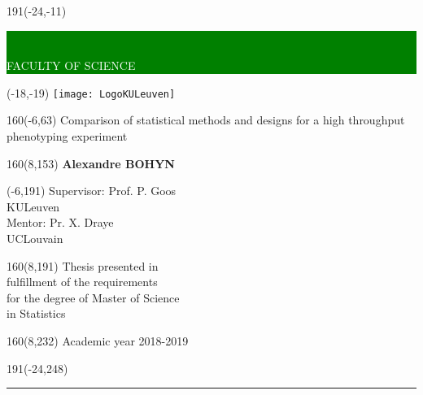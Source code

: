 \thispagestyle{empty}
\newcommand{\form}[1]{\scalebox{1.087}{\boldmath{#1}}}

%
\begin{textblock}{191}(-24,-11)
\colorbox{green}{\hspace{139mm}\ \parbox[c][18truemm]{52mm}{\textcolor{white}{FACULTY OF SCIENCE}}}
\end{textblock}
%
\begin{textblock}{70}(-18,-19)
\textblockcolour{}
\texttt{[image: LogoKULeuven]}
\end{textblock}
%
\begin{textblock}{160}(-6,63)
\textblockcolour{}
\vspace{-\parskip}
\flushleft
\fontsize{40}{42}\selectfont \textcolor{bluetitle}{Comparison of statistical methods and designs for a high throughput phenotyping experiment}\\[1.5mm]
\end{textblock}
%
\begin{textblock}{160}(8,153)
\textblockcolour{}
\vspace{-\parskip}
\flushright
\fontsize{14}{16}\selectfont \textbf{Alexandre BOHYN}
\end{textblock}
%
\begin{textblock}{70}(-6,191)
\textblockcolour{}
\vspace{-\parskip}
\flushleft
Supervisor: Prof. P. Goos\\[-2pt]
\textcolor{blueaff}{KULeuven}\\[5pt]
Mentor: Pr. X. Draye\\[-2pt]
\textcolor{blueaff}{UCLouvain}\\[5pt]
\end{textblock}
%
\begin{textblock}{160}(8,191)
\textblockcolour{}
\vspace{-\parskip}
\flushright
Thesis presented in\\[4.5pt]
fulfillment of the requirements\\[4.5pt]
for the degree of Master of Science\\[4.5pt]
in Statistics\\
\end{textblock}
%
\begin{textblock}{160}(8,232)
\textblockcolour{}
\vspace{-\parskip}
\flushright
Academic year 2018-2019
\end{textblock}
%
\begin{textblock}{191}(-24,248)
{\color{blueline}\rule{550pt}{5.5pt}}
\end{textblock}
%
\vfill

